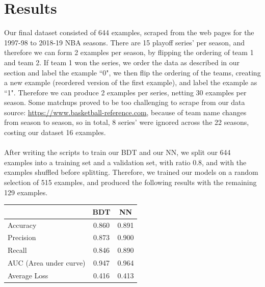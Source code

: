 \documentclass[letterpaper]{article} %
\begin{document}

\section{Results}

Our final dataset consisted of 644 examples, scraped from the web pages for the 1997-98 to 2018-19 NBA seasons. There are 15 playoff series' per season, and therefore we can form 2 examples per season, by flipping the ordering of team 1 and team 2. If team 1 won the series, we order the data as described in our  section and label the example ``0", we then flip the ordering of the teams, creating a new example (reordered version of the first example), and label the example as ``1". Therefore we can produce 2 examples per series, netting 30 examples per season. Some matchups proved to be too challenging to scrape from our data source: \href{https://www.basketball-reference.com}{https://www.basketball-reference.com}, because of team name changes from season to season, so in total, 8 series' were ignored across the 22 seasons, costing our dataset 16 examples. \\ \\
After writing the scripts to train our BDT and our NN, we split our 644 examples into a training set and a validation set, with ratio 0.8, and with the examples shuffled before splitting. Therefore, we trained our models on a random selection of 515 examples, and produced the following results with the remaining 129 examples.
\begin{center}
\begin{tabular}{|l|c|c|} \hline
& BDT & NN \\ \hline
Accuracy & 0.860 & 0.891 \\ \hline
Precision & 0.873 & 0.900 \\ \hline
Recall & 0.846 & 0.890 \\ \hline
AUC (Area under curve) & 0.947 & 0.964 \\ \hline
Average Loss & 0.416 & 0.413 \\ \hline
\end{tabular}
\end{center}
\end{document}
